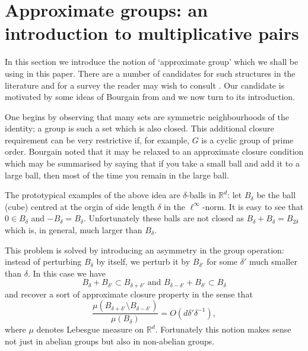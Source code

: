 \documentclass[12pt]{amsart}
\numberwithin{equation}{section}
\theoremstyle{plain}
\theoremstyle{definition}
\newcommand{\R}{\mathbb{R}}
\begin{document}
\section{Approximate groups: an introduction to multiplicative pairs}\label{sec.ag}

In this section we introduce the notion of `approximate group' which we shall be using in this paper.  There are a number of candidates for such structures in the literature and for a survey the reader may wish to consult \cite{BJGS}.  Our candidate is motivated by some ideas of Bourgain from \cite{JB} and we now turn to its introduction.

One begins by observing that many sets are symmetric neighbourhoods of the identity; a group is such a set which is also closed.  This additional closure requirement can be very restrictive if, for example, $G$ is a cyclic group of prime order.  Bourgain noted that it may be relaxed to an approximate closure condition which may be summarised by saying that if you take a small ball and add it to a large ball, then most of the time you remain in the large ball.

The prototypical examples of the above idea are $\delta$-balls in $\R^d$: let $B_\delta$ be the ball (cube) centred at the orgin of side length $\delta$ in the $\ell^\infty$-norm.  It is easy to see that $0 \in B_\delta$ and $-B_\delta = B_\delta$.  Unfortunately these balls are not closed as $B_\delta +B_\delta = B_{2\delta}$ which is, in general, much larger than $B_\delta$.

This problem is solved by introducing an asymmetry in the group operation: instead of perturbing $B_\delta$ by itself, we perturb it by $B_{\delta'}$ for some $\delta'$ much smaller than $\delta$.  In this case we have
\begin{equation*}
B_\delta+B_{\delta'} \subset B_{\delta+\delta'} \textrm{ and } B_{\delta-\delta'} + B_{\delta'} \subset B_\delta
\end{equation*}
and recover a sort of approximate closure property in the sense that
\begin{equation*}
\frac{\mu(B_{\delta+\delta'}\setminus B_{\delta-\delta'})}{\mu(B_\delta)}= O(d\delta'\delta^{-1}),
\end{equation*}
where $\mu$ denotes Lebesgue measure on $\R^d$.  Fortunately this notion makes sense not just in abelian groups but also in non-abelian groups.
\end{document}
